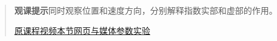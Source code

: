 \begin{quote}\small\textbf{观课提示}\quad 同时观察位置和速度方向，分别解释指数实部和虚部的作用。

\href{https://www.youtube.com/watch?v=-j8PzkZ70Lg}{原课程视频}\quad\href{https://vitael04213.github.io/3blue1brown-notes/lessons/complex-exponents.html}{本节网页与媒体}\quad\href{https://vitael04213.github.io/3blue1brown-notes/lab.html\#complex}{参数实验}
\end{quote}
